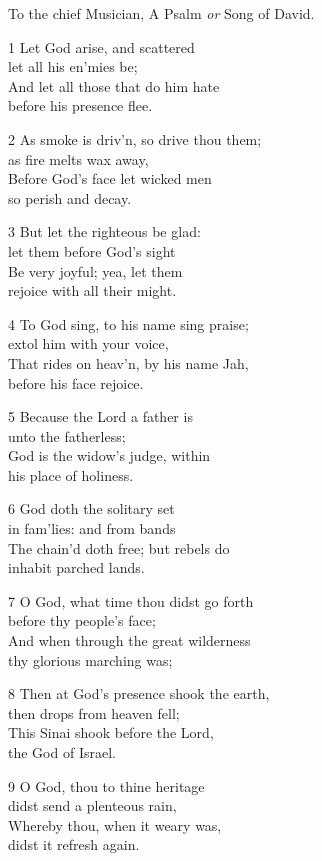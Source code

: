 \begin{multicols}{3}
To the chief Musician,
A Psalm \emph{or} Song of David.

1 Let God arise, and scattered\\
let all his en’mies be;\\
And let all those that do him hate\\
before his presence flee.

2 As smoke is driv’n, so drive thou them;\\
as fire melts wax away,\\
Before God’s face let wicked men\\
so perish and decay.

3 But let the righteous be glad:\\
let them before God’s sight\\
Be very joyful; yea, let them\\
rejoice with all their might.

4 To God sing, to his name sing praise;\\
extol him with your voice,\\
That rides on heav’n, by his name Jah,\\
before his face rejoice.

5 Because the Lord a father is\\
unto the fatherless;\\
God is the widow’s judge, within\\
his place of holiness.

6 God doth the solitary set\\
in fam’lies: and from bands\\
The chain’d doth free; but rebels do\\
inhabit parched lands.

7 O God, what time thou didst go forth\\
before thy people’s face;\\
And when through the great wilderness\\
thy glorious marching was;

8 Then at God’s presence shook the earth,\\
then drops from heaven fell;\\
This Sinai shook before the Lord,\\
the God of Israel.

9 O God, thou to thine heritage\\
didst send a plenteous rain,\\
Whereby thou, when it weary was,\\
didst it refresh again.


\end{multicols}
